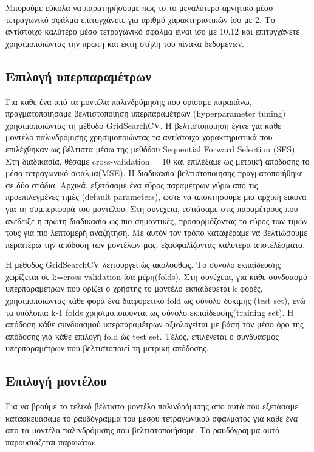 \documentclass[12pt]{article}
\begin{document}
Μπορούμε εύκολα να παρατηρήσουμε πως το το μεγαλύτερο αρνητικό μέσο τετραγωνικό σφάλμα επιτυγχάνετε για αριθμό χαρακτηριστικών ίσο με 2. Το αντίστοιχο καλύτερο μέσο τετραγωνικό σφάλμα είναι ίσο με 10.12 και επιτυγχάνετε χρησιμοποιώντας την πρώτη και έκτη στήλη του πίνακα δεδομένων.

\vspace{2cm}



\subsection{Επιλογή υπερπαραμέτρων}
Για κάθε ένα από τα μοντέλα παλινδρόμησης που ορίσαμε παραπάνω, πραγματοποιήσαμε βελτιστοποίηση υπερπαραμέτρων (hyperparameter tuning) χρησιμοποιώντας τη μέθοδο GridSearchCV. Η βελτιστοποίηση έγινε για κάθε μοντέλο παλινδρόμισης χρησιμοποιώντας τα αντίστοιχα χαρακτηριστικά που επιλέχθηκαν ως βέλτιστα μέσω της μεθόδου Sequential Forward Selection (SFS). Στη διαδικασία, θέσαμε cross-validation = 10 και επιλέξαμε ως μετρική απόδοσης το μέσο τετραγωνικό σφάλμα(MSE). Η διαδικασία βελτιστοποίησης πραγματοποιήθηκε σε δύο στάδια. Aρχικά, εξετάσαμε ένα εύρος παραμέτρων γύρω από τις προεπιλεγμένες τιμές (default parameters), ώστε να αποκτήσουμε μια αρχική εικόνα για τη συμπεριφορά του μοντέλου. Στη συνέχεια, εστιάσαμε στις παραμέτρους που ανέδειξε η πρώτη διαδικασία ως πιο σημαντικές, προσαρμόζοντας το εύρος των τιμών τους για πιο λεπτομερή αναζήτηση. Με αυτόν τον τρόπο καταφέραμε να βελτιώσουμε περαιτέρω την απόδοση των μοντέλων μας, εξασφαλίζοντας καλύτερα αποτελέσματα.

Η μέθοδος GridSearchCV λειτουργεί ώς ακολούθως.
Το σύνολο εκπαίδευσης χωρίζεται σε k=cross-validation ίσα μέρη(folds). Στη συνέχεια, για κάθε συνδυασμό υπερπαραμέτρων που ορίζει ο χρήστης το μοντέλο εκπαιδεύεται k φορές, χρησιμοποιώντας κάθε φορά ένα διαφορετικό fold ως σύνολο δοκιμής (test set), ενώ τα υπόλοιπα k-1 folds χρησιμοποιούνται ως σύνολο εκπαίδευσης(training set). Η απόδοση κάθε συνδυασμού υπερπαραμέτρων αξιολογείται με βάση τον μέσο όρο της απόδοσης για κάθε επιλογή fold ώς test set. Τέλος, επιλέγεται ο συνδυασμός υπερπαραμέτρων που βελτιστοποιεί τη μετρική απόδοσης.
\subsection{Επιλογή μοντέλου}
Για να βρούμε το τελικό βέλτιστο μοντέλο παλινδρόμισης απο αυτά που εξετάσαμε κατασκευάσαμε το ραυδόγραμμα του μέσου τετραγωνικού σφάλματος για κάθε ένα απο τα μοντέλα παλινδρόμισης που βελτιστοποιήσαμε. Το ραυδόγραμμα αυτό παρουσιάζεται παρακάτω: 
\end{document}
